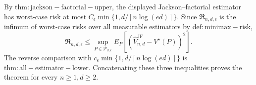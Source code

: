 By \(\mathrm{thm:jackson-factorial-upper}\), the displayed Jackson--factorial estimator has worst-case risk at most \(C_\epsilon\min\{1,d/[n\log(ed)]\}\).  Since \(\mathfrak R_{n,d,\epsilon}\) is the infimum of worst-case risks over all measurable estimators by \(\mathrm{def:minimax-risk}\),
\[
 \mathfrak R_{n,d,\epsilon}
 \leq\sup_{P\in\mathcal P_{d,\epsilon}}
 E_P[(\widehat V_{n,d}^{\mathrm{JF}}-V^\star(P))^2].
\]
The reverse comparison with \(c_\epsilon\min\{1,d/[n\log(ed)]\}\) is \(\mathrm{thm:all-estimator-lower}\).  Concatenating these three inequalities proves the theorem for every \(n\geq1,d\geq2\).